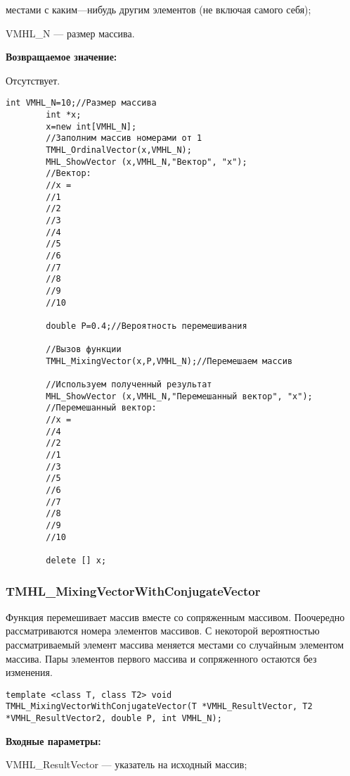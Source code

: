 \documentclass[a4paper,12pt]{article}
\begin{document}
местами с каким---нибудь другим элементов (не включая самого себя);
 
VMHL\_N --- размер массива.

\textbf{Возвращаемое значение:}

Отсутствует.


\begin{lstlisting}[label=code_use_TMHL_MixingVector,caption=Пример использования]
        int VMHL_N=10;//Размер массива
        int *x;
        x=new int[VMHL_N];
        //Заполним массив номерами от 1
        TMHL_OrdinalVector(x,VMHL_N);
        MHL_ShowVector (x,VMHL_N,"Вектор", "x");
        //Вектор:
        //x =
        //1
        //2
        //3
        //4
        //5
        //6
        //7
        //8
        //9
        //10

        double P=0.4;//Вероятность перемешивания

        //Вызов функции
        TMHL_MixingVector(x,P,VMHL_N);//Перемешаем массив

        //Используем полученный результат
        MHL_ShowVector (x,VMHL_N,"Перемешанный вектор", "x");
        //Перемешанный вектор:
        //x =
        //4
        //2
        //1
        //3
        //5
        //6
        //7
        //8
        //9
        //10

        delete [] x;
\end{lstlisting}

\subsubsection{TMHL\_MixingVectorWithConjugateVector}\label{TMHL_MixingVectorWithConjugateVector}

Функция перемешивает массив вместе со сопряженным массивом. Поочередно рассматриваются номера элементов массивов. С некоторой вероятностью рассматриваемый элемент массива меняется местами со случайным элементом массива. Пары элементов первого массива и сопряженного остаются без изменения.


\begin{lstlisting}[label=code_syntax_TMHL_MixingVectorWithConjugateVector,caption=Синтаксис]
template <class T, class T2> void TMHL_MixingVectorWithConjugateVector(T *VMHL_ResultVector, T2 *VMHL_ResultVector2, double P, int VMHL_N);
\end{lstlisting}

\textbf{Входные параметры:}
 
VMHL\_ResultVector --- указатель на исходный массив;
 
\end{document}
